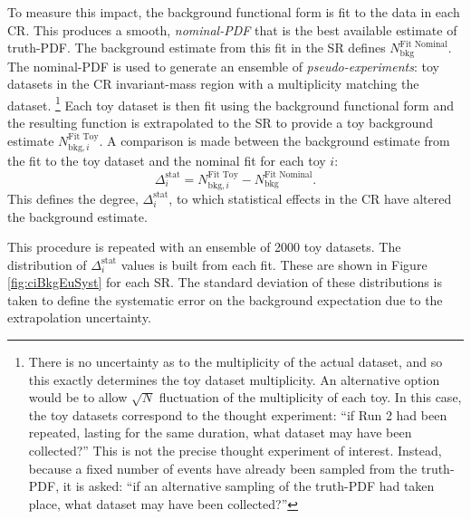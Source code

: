 To measure this impact, the background functional form is fit to the data in each CR.
This produces a smooth, \emph{nominal-PDF} that is the best available estimate of truth-PDF.
The background estimate from this fit in the SR defines $N_\text{bkg}^\text{Fit Nominal}$.
The nominal-PDF is used to generate an ensemble of \emph{pseudo-experiments}: toy datasets in the CR invariant-mass region with a multiplicity matching the dataset.
\footnote{There is no uncertainty as to the multiplicity of the actual dataset, and so this exactly determines the toy dataset multiplicity. An alternative option would be to allow $\sqrt{N}$ fluctuation of the multiplicity of each toy. In this case, the toy datasets correspond to the thought experiment: ``if Run 2 had been repeated, lasting for the same duration, what dataset may have been collected?'' This is not the precise thought experiment of interest. Instead, because a fixed number of events have already been sampled from the truth-PDF, it is asked: ``if an alternative sampling of the truth-PDF had taken place, what dataset may have been collected?''}
Each toy dataset is then fit using the background functional form and the resulting function is extrapolated to the SR to provide a toy background estimate $N_{\text{bkg},i}^\text{Fit Toy}$.
A comparison is made between the background estimate from the fit to the toy dataset and the nominal fit for each toy $i$:
\begin{equation*}
    \Delta_i^\text{stat}=N_{\text{bkg},i}^\text{Fit Toy}-N_\text{bkg}^\text{Fit Nominal}.
\end{equation*}
This defines the degree, $\Delta_i^\text{stat}$, to which statistical effects in the CR have altered the background estimate.


This procedure is repeated with an ensemble of 2000 toy datasets.
The distribution of $\Delta_i^\text{stat}$ values is built from each fit. These are shown in Figure \ref{fig:ciBkgEuSyst} for each SR.
The standard deviation of these distributions is taken to define the systematic error on the background expectation due to the extrapolation uncertainty.

